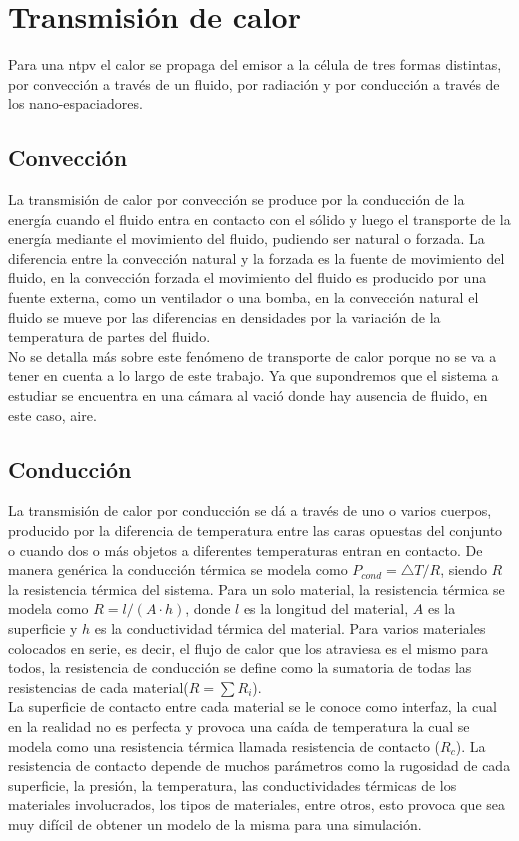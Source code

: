 \section{Transmisión de calor}
Para una \acrshort{ntpv} el calor se propaga del emisor a la célula de tres formas distintas, por convección a través de un fluido, por radiación y por conducción a través de los nano-espaciadores.
\subsection{Convección}
La transmisión de calor por convección se produce por la conducción de la energía cuando el fluido entra en contacto con el sólido y luego el transporte de la energía mediante el movimiento del fluido, pudiendo ser natural o forzada. La diferencia entre la convección natural y la forzada es la fuente de movimiento del fluido, en la convección forzada el movimiento del fluido es producido por una fuente externa, como un ventilador o una bomba, en la convección natural el fluido se mueve por las diferencias en densidades por la variación de la temperatura de partes del fluido.\\

No se detalla más sobre este fenómeno de transporte de calor porque no se va a tener en cuenta a lo largo de este trabajo. Ya que supondremos que el sistema a estudiar se encuentra en una cámara al vació donde hay ausencia de fluido, en este caso, aire.
\subsection{Conducción}
La transmisión de calor por conducción se dá a través de uno o varios cuerpos, producido por la diferencia de temperatura entre las caras opuestas del conjunto o cuando dos o más objetos a diferentes temperaturas entran en contacto. De manera genérica la conducción térmica se modela como $P_{cond}={\bigtriangleup T}/{R} $, siendo $R$ la resistencia térmica del sistema.
Para un solo material, la resistencia térmica se modela como $R = l/{\left(A\cdot h\right)}$, donde $l$ es la longitud del material, $A$ es la superficie y $h$ es la conductividad térmica del material. Para varios materiales colocados en serie, es decir, el flujo de calor que los atraviesa es el mismo para todos, la resistencia de conducción se define como la sumatoria de todas las resistencias de cada material($R=\sum R_i$).\\

La superficie de contacto entre cada material se le conoce como interfaz, la cual en la realidad no es perfecta y provoca una caída de temperatura la cual se modela como una resistencia térmica llamada resistencia de contacto ($R_c$). La resistencia de contacto depende de muchos parámetros como la rugosidad de cada superficie, la presión, la temperatura, las conductividades térmicas de los materiales involucrados, los tipos de materiales, entre otros, esto provoca que sea muy difícil de obtener un modelo de la misma para una simulación.\\

